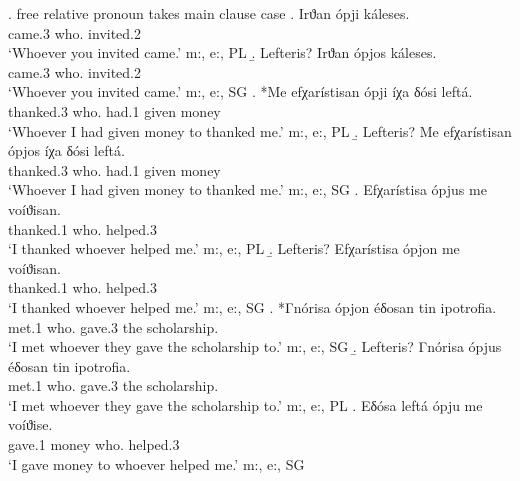 \ex. free relative pronoun takes main clause case
\ag. Irϑan ópji káleses.\\
came.3 who. invited.2\\
`Whoever you invited came.' \hfill m:, e:, PL
\b. Lefteris?
\gll Irϑan ópjos káleses.\\
came.3 who. invited.2\\
`Whoever you invited came.' \hfill m:, e:, SG
\bg. *Me efχarístisan ópji íχa δósi leftá.\\
 thanked.3 who. had.1 given money\\
`Whoever I had given money to thanked me.' \hfill m:, e:, PL
\b. Lefteris?
\gll Me efχarístisan ópjos íχa δósi leftá.\\
 thanked.3 who. had.1 given money\\
`Whoever I had given money to thanked me.' \hfill m:, e:, SG
\bg. Efχarístisa ópjus me voíϑisan.\\
thanked.1 who.  helped.3\\
`I thanked whoever helped me.' \hfill m:, e:, PL
\b. Lefteris?
\gll Efχarístisa ópjon me voíϑisan.\\
thanked.1 who.  helped.3\\
`I thanked whoever helped me.' \hfill m:, e:, SG
\bg. *Γnórisa ópjon éδosan tin ipotrofia.\\
met.1 who. gave.3 the scholarship.\\
`I met whoever they gave the scholarship to.' \hfill m:, e:, SG
\b. Lefteris?
\gll Γnórisa ópjus éδosan tin ipotrofia.\\
met.1 who. gave.3 the scholarship.\\
`I met whoever they gave the scholarship to.' \hfill m:, e:, PL
\bg. Eδósa leftá ópju me voíϑise.\\
gave.1 money who.   helped.3\\
`I gave money to whoever helped me.' \hfill m:, e:, SG
